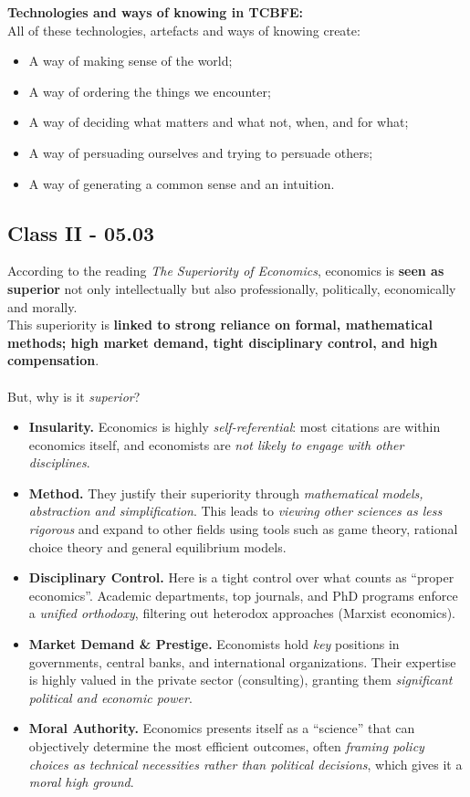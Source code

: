\documentclass[a4paper,12pt]{article}
\begin{document}
\noindent \textbf{Technologies and ways of knowing in TCBFE:} \\
All of these technologies, artefacts and ways of knowing create:
\begin{itemize}
	\item A way of making sense of the world;
	\item A way of ordering the things we encounter;
	\item A way of deciding what matters and what not, when, and for what;
	\item A way of persuading ourselves and trying to persuade others;
	\item A way of generating a common sense and an intuition. \\
\end{itemize}
\subsection*{Class II - 05.03}
\noindent According to the reading \textit{The Superiority of Economics}, economics is \textbf{seen as superior} not only intellectually but also professionally, politically, economically and morally. \\
This superiority is \textbf{linked to strong reliance on formal, mathematical methods; high market demand, tight disciplinary control, and high compensation}. \\
\\
\noindent But, why is it \emph{superior}?
\begin{itemize}
	\item \textbf{Insularity.} Economics is highly \emph{self-referential}: most citations are within economics itself, and economists are \emph{not likely to engage with other disciplines}.
	\item \textbf{Method.} They justify their superiority through \emph{mathematical models, abstraction and simplification}. This leads to \emph{viewing other sciences as less rigorous} and expand to other fields using tools such as game theory, rational choice theory and general equilibrium models.
	\item \textbf{Disciplinary Control.} Here is a tight control over what counts as ``proper economics''. Academic departments, top journals, and PhD programs enforce a \emph{unified orthodoxy}, filtering out heterodox approaches (Marxist economics).
	\item \textbf{Market Demand \& Prestige.} Economists hold \emph{key} positions in governments, central banks, and international organizations. Their expertise is highly valued in the private sector (consulting), granting them \emph{significant political and economic power}.
	\item \textbf{Moral Authority.} Economics presents itself as a ``science'' that can objectively determine the most efficient outcomes, often \emph{framing policy choices as technical necessities rather than political decisions}, which gives it a \emph{moral high ground}.
\end{itemize}
\end{document}
